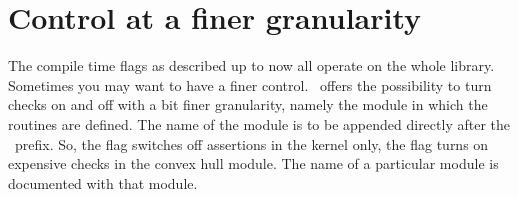 \ccGlueBegin
{}
\ccGlueEnd

\section{Control at a finer granularity}

The compile time flags as described up to now all operate on the whole 
library.
Sometimes you may want to have a finer control.
\cgal\ offers the possibility to turn checks on and off with a bit finer
granularity, namely the module in which the routines are defined.
The name of the module is to be appended directly after the \cgal\ prefix.
So, the flag  switches off assertions in 
the kernel only, the flag  turns on
expensive checks in the convex hull module.
The name of a particular module is documented with that module.

